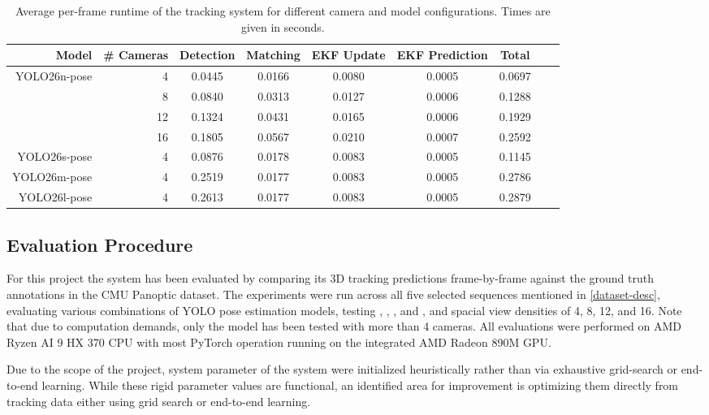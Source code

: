 \begin{table}[!ht]
  \centering
  \begin{tabular}{|r|r|c|c|c|c|c|c|c|}
  \hline
    Model & \# Cameras & Detection & Matching & EKF Update & EKF Prediction & Total \\ \hline
    \multirow{4}{*}{YOLO26n-pose}  & 4 & 0.0445 & 0.0166 & 0.0080 & 0.0005 & 0.0697 \\ \cline{2-7}
      & 8 & 0.0840 & 0.0313 & 0.0127 & 0.0006 & 0.1288 \\ \cline{2-7}
      & 12 & 0.1324 & 0.0431 & 0.0165 & 0.0006 & 0.1929 \\ \cline{2-7}
      & 16 & 0.1805 & 0.0567  & 0.0210 & 0.0007 & 0.2592 \\ \hline \hline
    YOLO26s-pose & 4 & 0.0876 & 0.0178 & 0.0083 & 0.0005 & 0.1145 \\ \hline
    YOLO26m-pose & 4 & 0.2519 & 0.0177 & 0.0083 & 0.0005 & 0.2786 \\ \hline
    YOLO26l-pose & 4 & 0.2613 & 0.0177 & 0.0083 & 0.0005 & 0.2879 \\ \hline
  \end{tabular}
  \caption{Average per-frame runtime of the tracking system for different camera and model configurations. Times are given in seconds.}
  \label{fig:perf}
\end{table}

\subsection{Evaluation Procedure} \label{eval-proc}

For this project the system has been evaluated by comparing its 3D tracking predictions frame-by-frame against the ground truth annotations in the CMU Panoptic dataset. The experiments were run across all five selected sequences mentioned in \cref{dataset-desc}, evaluating various combinations of YOLO pose estimation models, testing , , , and , and spacial view densities of 4, 8, 12, and 16. Note that due to computation demands, only the  model has been tested with more than 4 cameras. All evaluations were performed on AMD Ryzen AI 9 HX 370 CPU with most PyTorch \parencite{paszke2019pytorch,ansel2024pytorch} operation running on the integrated AMD Radeon 890M GPU.

Due to the scope of the project, system parameter of the system were initialized heuristically rather than via exhaustive grid-search or end-to-end learning. While these rigid parameter values are functional, an identified area for improvement is optimizing them directly from tracking data either using grid search or end-to-end learning.

